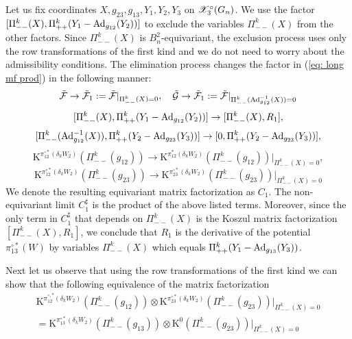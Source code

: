 Let us fix coordinates $X,g_{23},g_{13},Y_1,Y_2,Y_3$ on $\mathscr{X}^\circ_3(G_n)$.
We use  the factor $[\Pi_{--}^k(X), \Pi_{++}^k(Y_1-{\rm Ad}_{g_{12}}(Y_2))]$ to exclude the variables $\Pi_{--}^k(X)$ from the other factors.
Since $\Pi_{--}^k(X)$  is $B_n^2$-equivariant, the exclusion process uses only the row transformations of the first
kind and we do not need to worry about the admissibility conditions.
The elimination process changes the factor in  (\ref{eq: long mf prod}) in the following manner:
$$\tilde{\mathcal{F}}\to\tilde{\mathcal{F}}_1:= \tilde{\mathcal{F}}|_{\Pi_{--}^k(X)=0},\quad
     \tilde{\mathcal{G}}\to\tilde{\mathcal{F}}_1:= \tilde{\mathcal{F}}|_{\Pi_{--}^k({\rm Ad}_{g_{12}}^{-1}(X))=0}$$
$$  [\Pi_{--}^k(X), \Pi_{++}^k(Y_1-{\rm Ad}_{g_{12}}(Y_2))]\to  [\Pi_{--}^k(X), R_1],$$
$$ [\Pi_{--}^k({\rm Ad}_{g_{12}}^{-1}(X)), \Pi_{++}^k(Y_2-{\rm Ad}_{g_{23}}(Y_3))]\to [0,\Pi_{++}^k(Y_2-{\rm Ad}_{g_{23}}(Y_3))],$$
$$ \mathrm{K}^{\pi_{12}^{\circ*}(\delta_k W_2)} (\Pi_{--}^{k}(g_{12}))
\to  \mathrm{K}^{\pi_{12}^*(\delta_k W_2)} (\Pi_{--}^{k}(g_{12}))|_{\Pi_{--}^k(X)=0},$$
$$  \mathrm{K}^{\pi_{12}^{\circ*}(\delta_k W_2)} (\Pi_{--}^{k}(g_{23}))\to  \mathrm{K}^{\pi_{23}^{\circ*}(\delta_k W_2)} (\Pi_{--}^{k}(g_{23}))|_{\Pi_{--}^k(X)=0}$$
We denote the resulting equivariant matrix factorization as $C_1$. The non-equivariant limit $C_1^\sharp$ is the product of the above listed terms. Moreover, since the only term in
$C_1^\sharp$ that depends on $\Pi_{--}^k(X)$ is the Koszul matrix factorization $[\Pi_{--}^k(X),R_1]$, we conclude that $R_1$ is the derivative of the potential $\pi_{13}^{\circ*}(W)$ by
variables $\Pi_{--}^k(X)$ which equals $\Pi_{++}^k(Y_1-{\rm Ad}_{g_{13}}(Y_3))$.

Next let us observe that using the row transformations of the first kind we can show that the following equivalence of the matrix factorization
 \begin{multline*}
 \mathrm{K}^{\pi_{12}^{\circ,*}(\delta_k W_2)} (\Pi_{--}^{k}(g_{12}))\otimes \mathrm{K}^{\pi_{23}^{\circ*}(\delta_k W_2)} (\Pi_{--}^{k}(g_{23}))|_{\Pi_{--}^k(X)=0}\\
 = \mathrm{K}^{\pi_{13}^{\circ*}(\delta_k W_2)} (\Pi_{--}^{k}(g_{13}))\otimes \mathrm{K}^{0} (\Pi_{--}^{k}(g_{23}))|_{\Pi_{--}^k(X)=0}
 \end{multline*}

